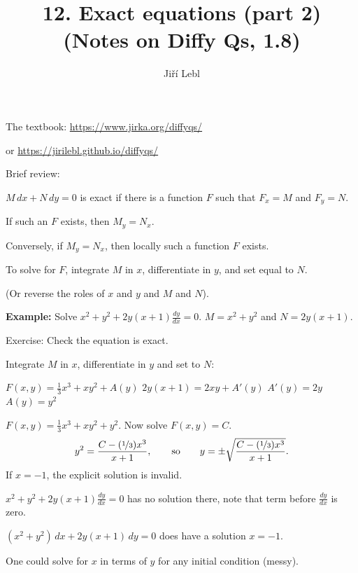 \documentclass[10pt,aspectratio=169]{beamer}
\author{Ji\v{r}\'i Lebl}
\institute[OSU]{%
Oklahoma State University%
}
\title{12. Exact equations (part 2)\\(Notes on Diffy Qs, 1.8)}
\date{}
\begin{document}
\begin{frame}
\titlepage


\begin{center}
The textbook: \url{https://www.jirka.org/diffyqs/}

or \url{https://jirilebl.github.io/diffyqs/}
\end{center}
\end{frame}

\begin{frame}
Brief review:

\medskip
\pause

$M \, dx + N \, dy = 0$ is exact if there is a
function $F$ such that $F_x = M$ and $F_y = N$.

\medskip
\pause

If such an $F$ exists, then $M_y = N_x$.

\pause

Conversely, if $M_y = N_x$, then 
locally such a function $F$ exists.

\medskip
\pause

To solve for $F$, integrate $M$ in $x$, differentiate
in $y$, and set equal to $N$.

\pause
(Or reverse the roles of $x$ and $y$ and $M$ and $N$).

\end{frame}

\begin{frame}

\textbf{Example:}
Solve
\quad
$x^2+y^2 + 2y(x+1) \frac{dy}{dx} = 0$.
\qquad
\pause
$M=x^2+y^2$ \quad and \quad $N=2y(x+1)$.

\medskip
\pause

Exercise:
Check the equation is exact.

\medskip
\pause

Integrate $M$ in $x$, differentiate in $y$ and set to $N$:

\medskip
\pause

$F(x,y) = \frac{1}{3}x^3 + xy^2 + A(y)$
\pause
\wthus
$2y(x+1) = 2xy + A'(y)$
\pause
\wthus
$A'(y)=2y$
\pause
\wthus
$A(y) = y^2$

\medskip
\pause

\thus \quad
$F(x,y) = \frac{1}{3}x^3 + xy^2 + y^2$.
\quad
\pause
Now solve $F(x,y) = C$.
\pause
\begin{equation*}
y^2 = \frac{C-(\nicefrac{1}{3})x^3}{x+1},
\qquad \text{so} \qquad
y = \pm \sqrt{\frac{C-(\nicefrac{1}{3})x^3}{x+1}} .
\end{equation*}
If $x=-1$, the explicit solution is invalid.

\medskip
\pause

$x^2+y^2 + 2y(x+1) \frac{dy}{dx} = 0$ has no solution there,
note that term before
$\frac{dy}{dx}$ is zero.

\medskip
\pause

$(x^2+y^2) \, dx + 2y(x+1) \, dy = 0$ does have a solution $x=-1$.

\medskip
\pause

One could solve for $x$ in terms of $y$ for any initial condition (messy).
\end{frame}
\end{document}
